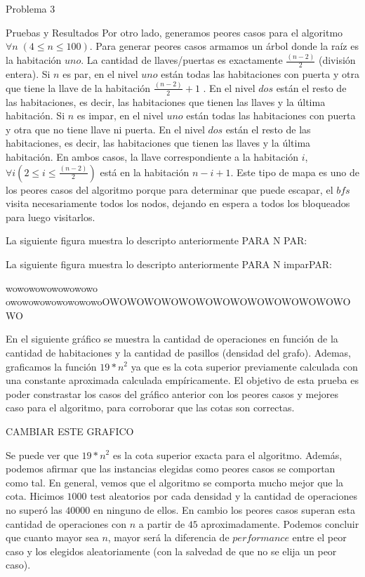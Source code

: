 \begin{section}{Problema 3}
\begin{subsection}{Pruebas y Resultados}
		Por otro lado, generamos peores casos para el algoritmo $\forall n\; (4 \leq n \leq 100)$. Para generar peores casos armamos un árbol donde la raíz es la habitación  $uno$. La cantidad de llaves/puertas es exactamente $\frac{(n-2)}{2}$ (división entera). Si $n$ es par, en el nivel $uno$  están todas las habitaciones con puerta y otra que tiene la llave de la habitación $\frac{(n-2)}{2} + 1$ . En el nivel $dos$ están el resto de las habitaciones, es decir, las habitaciones que tienen las llaves y la última habitación. Si $n$ es impar, en el nivel $uno$  están todas las habitaciones con puerta y otra que no tiene llave ni puerta. En el nivel $dos$ están el resto de las habitaciones, es decir, las habitaciones que tienen las llaves y la última habitación. En ambos casos, la llave correspondiente a la habitación $i$, $\forall i (2 \leq i \leq \frac{(n-2)}{2})$ está en la habitación $n-i+1$. Este tipo de mapa es uno de los peores casos del algoritmo porque para determinar que puede escapar, el $bfs$ visita necesariamente todos los nodos, dejando en espera a todos los bloqueados para luego visitarlos.

		La siguiente figura muestra lo descripto anteriormente PARA N PAR:


		La siguiente figura muestra lo descripto anteriormente PARA N imparPAR:

		wowowowowowowowo	owowowowowowowowoOWOWOWOWOWOWOWOWOWOWOWOWOWOWOWO


		En el siguiente gráfico se muestra la cantidad de operaciones en función de la cantidad de habitaciones y la cantidad de pasillos (densidad del grafo). Ademas, graficamos la función $19*n^2$ ya que es la cota superior previamente calculada con una constante aproximada calculada empíricamente. El objetivo de esta prueba es poder constrastar los casos del gráfico anterior con los peores casos y mejores caso para el algoritmo, para corroborar que las cotas son correctas. 
		
		CAMBIAR ESTE GRAFICO
	

		Se puede ver que $19*n^2$ es la cota superior exacta para el algoritmo. Además, podemos afirmar que las instancias elegidas como peores casos se comportan como tal. En general, vemos que el algoritmo se comporta mucho mejor que la cota. Hicimos $1000$ test aleatorios por cada densidad y la cantidad de operaciones no superó las $40000$ en ninguno de ellos. En cambio los peores casos superan esta cantidad de operaciones con $n$ a partir de $45$ aproximadamente. Podemos concluir que cuanto mayor sea $n$, mayor será la diferencia de $performance$ entre el peor caso y los elegidos aleatoriamente (con la salvedad de que no se elija un peor caso).


\end{subsection}
\end{section}
